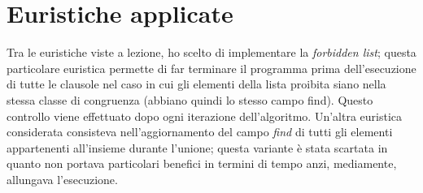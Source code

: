 \section{Euristiche applicate}
Tra le euristiche viste a lezione, ho scelto di implementare la \textit{forbidden list}; questa particolare euristica permette
di far terminare il programma prima dell'esecuzione di tutte le clausole nel caso in cui gli elementi della lista proibita
siano nella stessa classe di congruenza (abbiano quindi lo stesso campo find). Questo controllo viene effettuato dopo ogni
iterazione dell'algoritmo. Un'altra euristica considerata consisteva nell'aggiornamento del campo \textit{find} di tutti gli
elementi appartenenti all'insieme durante l'unione; questa variante è stata scartata in quanto non portava particolari
benefici in termini di tempo anzi, mediamente, allungava l'esecuzione.

